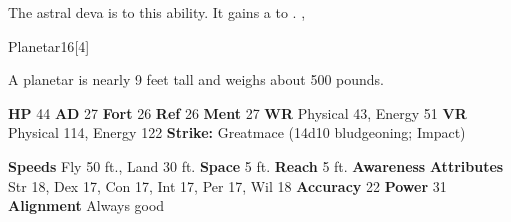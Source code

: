               The astral deva is  to this ability.
              It gains a   to .
  ,
  \begin{monsubsection}{Planetar}{16}[4]
    \vspace{-1em}\vspace{-1em}
    \vspace{0em}

    
          A planetar is nearly 9 feet tall and weighs about 500 pounds.
        
    

    \begin{spellcontent}
      \begin{spelltargetinginfo}
        \pari \textbf{HP} 44 \monsep
          \textbf{AD} 27 \monsep
          \textbf{Fort} 26 \monsep
          \textbf{Ref} 26 \monsep
          \textbf{Ment} 27
        \pari \textbf{WR} Physical 43, Energy 51 \monsep
        \textbf{VR} Physical 114, Energy 122
        \pari \textbf{Strike:}
            Greatmace  (14d10 bludgeoning; Impact)
      \end{spelltargetinginfo}
    \end{spellcontent}
    \begin{monsterfooter}
      \pari \textbf{Speeds} Fly 50 ft., Land 30 ft. \monsep
        \textbf{Space} 5 ft. \monsep
        \textbf{Reach} 5 ft.
      \pari \textbf{Awareness} 
      \pari \textbf{Attributes}
        Str 18, Dex 17,
        Con 17, Int 17,
        Per 17, Wil 18
      \pari \textbf{Accuracy} 22 \monsep
        \textbf{Power} 31
      \pari \textbf{Alignment} Always good
    \end{monsterfooter}
  \end{monsubsection}
  
